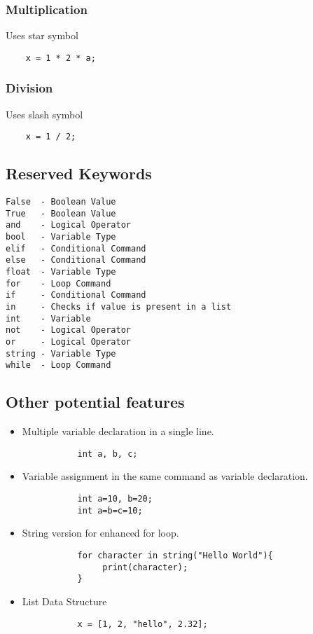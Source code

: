 \documentclass[12pt,letterpaper]{article}
\begin{document}
\subsubsection{Multiplication}
Uses star symbol
\begin{verbatim}
    x = 1 * 2 * a;
\end{verbatim}


\subsubsection{Division}
Uses slash symbol
\begin{verbatim}
    x = 1 / 2;
\end{verbatim}

\subsection{Reserved Keywords}
\begin{verbatim}
False  - Boolean Value
True   - Boolean Value
and    - Logical Operator
bool   - Variable Type
elif   - Conditional Command
else   - Conditional Command
float  - Variable Type
for    - Loop Command
if     - Conditional Command
in     - Checks if value is present in a list
int    - Variable
not    - Logical Operator
or     - Logical Operator
string - Variable Type
while  - Loop Command
\end{verbatim}

\subsection{Other potential features}
\begin{itemize}
    \item Multiple variable declaration in a single line.
        \begin{verbatim}
           int a, b, c;
        \end{verbatim}
    \item Variable assignment in the same command as variable declaration.
        \begin{verbatim}
           int a=10, b=20;
           int a=b=c=10;
        \end{verbatim}

    \item String version for enhanced for loop.
        \begin{verbatim}
           for character in string("Hello World"){
                print(character);
           }
        \end{verbatim}

    \item List Data Structure
        \begin{verbatim}
           x = [1, 2, "hello", 2.32];
        \end{verbatim}
\end{itemize}
\end{document}

